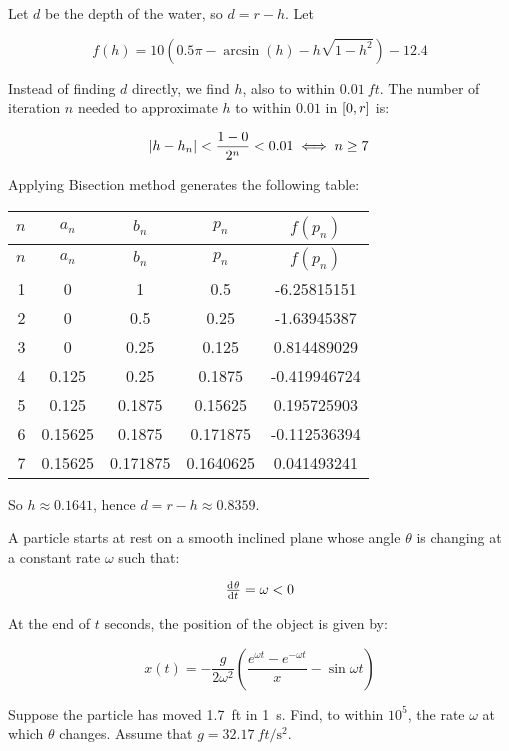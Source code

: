 \documentclass[../../../../Assignments.tex]{subfiles}
\begin{document}
\begin{solution}
    Let \(d\) be the depth of the water, so \(d = r - h\). Let

    \[f(h) = 10 (\num{0.5} \pi - \arcsin(h) - h \sqrt{1 - h^2}) - \num{12.4}\]

    Instead of finding \(d\) directly, we find \(h\), also to within
    \(\SI{0.01}{ft}\). The number of iteration \(n\) needed to approximate \(h\)
    to within \(\num{0.01}\) in \(\interval{0}{r}\) is:

    \[\abs{h - h_n} < \frac{1 - 0}{2^n} < \num{0.01} \iff n \geq 7\]

    Applying Bisection method generates the following table:

    \begin{longtable}{r S[table-format=1.5] S[table-format=1.6] S[table-format=1.7] S[table-format=-1.9]}
        \toprule
        \(n\)  &   {\(a_n\)}   &   {\(b_n\)}   &   {\(p_n\)}   &  {\(f(p_n)\)}  \\
        \midrule
        \endfirsthead
        \(n\)  &   {\(a_n\)}   &   {\(b_n\)}   &   {\(p_n\)}   &  {\(f(p_n)\)}  \\
        \midrule
          &  0            &  1            &  0.5          &  -6.25815151   \\
            2  &  0            &  0.5          &  0.25         &  -1.63945387   \\
            3  &  0            &  0.25         &  0.125        &   0.814489029  \\
            4  &  0.125        &  0.25         &  0.1875       &  -0.419946724  \\
            5  &  0.125        &  0.1875       &  0.15625      &   0.195725903  \\
            6  &  0.15625      &  0.1875       &  0.171875     &  -0.112536394  \\
            7  &  0.15625      &  0.171875     &  0.1640625    &   0.041493241  \\
        \bottomrule
    \end{longtable}

    So \(h \approx \num{0.1641}\), hence \(d = r - h \approx \num{0.8359}\).
\end{solution}

\begin{exercise}
    A particle starts at rest on a smooth inclined plane whose angle \(\theta\)
    is changing at a constant rate \(\omega\) such that:

    \[\od{\theta}{t} = \omega < 0\]

    At the end of \(t\) seconds, the position of the object is given by:

    \[x(t) = - \frac{g}{2 \omega^2} \left(\frac{e^{\omega t} - e^{- \omega t}}{x} - \sin \omega t\right)\]

    Suppose the particle has moved \SI{1.7}{ft} in \SI{1}{s}. Find, to within
    \(10^{5}\), the rate \(\omega\) at which \(\theta\) changes. Assume that \(g
    = \SI{32.17}{ft \per \second \squared}\).
\end{exercise}
\end{document}
